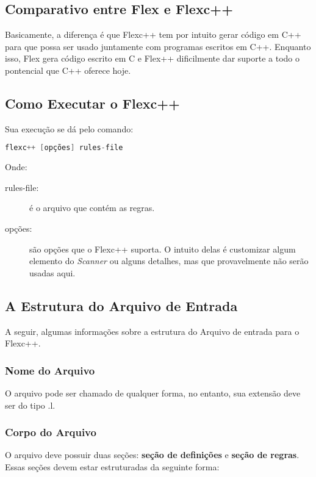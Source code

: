 \begin{apendicesenv}
\subsection{Comparativo entre Flex e Flexc++}
\par
\indent Basicamente, a diferença é que Flexc++ tem por intuito gerar código em C++ para que possa ser usado juntamente com programas escritos em C++. Enquanto isso, Flex gera código escrito em C e Flex++ dificilmente dar suporte a todo o pontencial que C++ oferece hoje.

\subsection{Como Executar o Flexc++}

Sua execução se dá pelo comando:
\begin{lstlisting}[language=c, label=apendiceCodigoFlex1, caption=Comando para Execução do Flexc++]
 flexc++ [opções] rules-file
\end{lstlisting}

Onde:
\begin{description}
\item[rules-file:] é o arquivo que contém as regras.
\item[opções:] são opções que o Flexc++ suporta. O intuito delas é customizar algum elemento do \textit{Scanner} ou alguns detalhes, mas que provavelmente não serão usadas aqui. 
\end{description}

\subsection{A Estrutura do Arquivo de Entrada}

A seguir, algumas informações sobre a estrutura do Arquivo de entrada para o Flexc++.

\subsubsection{Nome do Arquivo}

O arquivo pode ser chamado de qualquer forma, no entanto, sua extensão deve ser do tipo .l.

\subsubsection{Corpo do Arquivo}

O arquivo deve possuir duas seções: \textbf{seção de definições} e \textbf{seção de regras}. Essas seções devem estar estruturadas da seguinte forma:


\end{apendicesenv}
